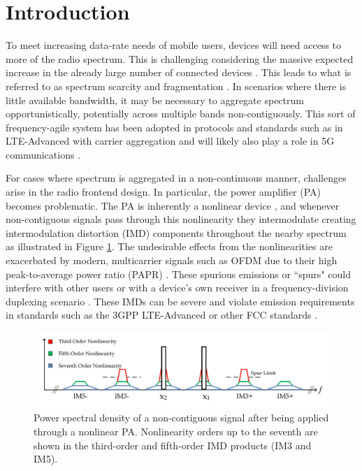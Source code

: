 \section{Introduction}
To meet increasing data-rate needs of mobile users, devices will need access to more of the radio spectrum. 
This is challenging considering the massive expected increase in the already large number of connected devices \cite{Cisco16}.
This leads to what is referred to as spectrum scarcity and fragmentation \cite{Staple04,Federated17}. 
In scenarios where there is little available bandwidth, it may be necessary to aggregate spectrum opportunistically, potentially across multiple bands non-contiguously. 
This sort of frequency-agile system has been adopted in protocols and standards such as in LTE-Advanced with carrier aggregation \cite{wannstrom_2013} and will likely also play a role in 5G communications \cite{Khan2014}.  

For cases where spectrum is aggregated in a non-continuous manner, challenges arise in the radio frontend design. 
In particular, the power amplifier (PA) becomes problematic. 
The PA is inherently a nonlinear device \cite{Ghannouchi09}, and whenever non-contiguous signals pass through this nonlinearity they intermodulate creating intermodulation distortion (IMD) components throughout the nearby spectrum as illustrated in Figure \ref{fig:PSD}.
{\color{red} The undesirable effects from the nonlinearities are exacerbated by modern, multicarrier signals such as OFDM due to their high peak-to-average power ratio (PAPR) \cite{Ghannouchi09}.}
These spurious emissions or ``spurs" could interfere with other users or with a device's own receiver in a frequency-division duplexing scenario \cite{Park13}. 
These IMDs can be severe and violate emission requirements in standards such as the 3GPP LTE-Advanced or other FCC standards    \cite{Commag_abdelaziz,3GPP_CA_Emissions_1,3GPP_CA_Emissions_2,LaehteensuoMay2013}. 

\begin{figure}
	\centering
	\centerline{\includegraphics[width=\columnwidth]{PSD.pdf}}
	\caption[]{Power spectral density of a non-contiguous signal after being applied through a nonlinear PA.
		Nonlinearity orders up to the seventh are shown in the third-order and fifth-order IMD products (IM3 and IM5).}
	\label{fig:PSD}
\end{figure}

